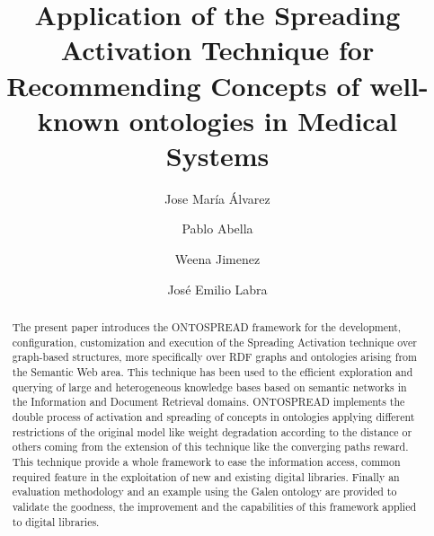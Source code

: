 \documentclass{llncs}
\begin{document}
\title{Application of the Spreading Activation Technique for Recommending Concepts of well-known ontologies in Medical Systems}


\author{Jose Mar\'{i}a \'{A}lvarez \and Pablo Abella \and Weena Jimenez \and Jos\'{e} Emilio Labra} 







\maketitle

\begin{abstract}
The present paper introduces the ONTOSPREAD framework for the development,
configuration, customization and execution of the Spreading Activation
technique over graph-based structures, more specifically over RDF graphs and ontologies 
arising from the Semantic Web area. This technique has been used to
the efficient exploration and querying of large and heterogeneous knowledge bases 
based on semantic networks in the Information and Document Retrieval domains. 
ONTOSPREAD implements the double process of activation and spreading of concepts in ontologies applying 
different restrictions of the original model like weight degradation according to the distance or 
others coming from the extension of this technique like the converging paths reward. 
This technique provide a whole framework to ease the information access, 
common required feature in the exploitation of new and existing digital libraries. 
Finally an evaluation methodology and an example using the Galen ontology 
are provided to validate the goodness, the improvement and the capabilities of this framework applied 
to digital libraries.
\end{abstract}

\end{document}
